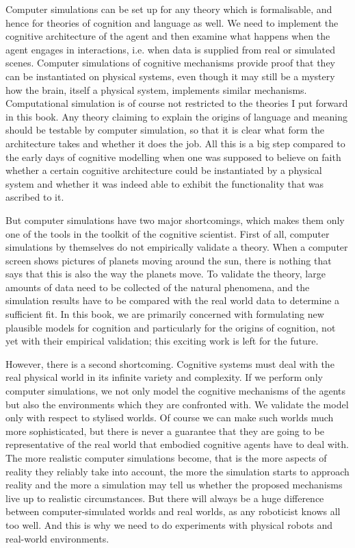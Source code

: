 Computer simulations can be set up for any theory which 
is formalisable, and hence for theories of cognition
and language as well. We need to implement the cognitive architecture
of the agent and then examine what happens when the agent
engages in interactions, i.e. when data is supplied from 
real or simulated scenes. Computer simulations of cognitive mechanisms
provide proof that they can be instantiated
on physical systems, even though it may still be
a mystery how the brain, 
itself a physical system, implements similar mechanisms. 
Computational simulation is of course 
not restricted to the theories I put forward in 
this book. Any theory claiming
to explain the origins of language and meaning 
should be testable by computer simulation, so that 
it is clear what form the architecture takes and whether
it does the job. All this is a big step compared to 
the early days of cognitive modelling when one was
supposed to believe on faith whether a certain cognitive
architecture could be instantiated by a physical 
system and whether it was indeed able to exhibit the functionality 
that was ascribed to it. 

But computer simulations have two major shortcomings, 
which makes them only one of the tools in the toolkit 
of the cognitive scientist. First of all, computer simulations by
themselves do not empirically validate a theory. When 
a computer screen shows pictures of planets moving around 
the sun, there is nothing that says that this is also 
the way the planets move. To validate the theory, large amounts of
data need to be collected of
the natural phenomena, and the simulation 
results have to be compared with the real world data to determine a sufficient
fit. In this book, we are primarily concerned with 
formulating new plausible models for cognition and particularly
for the origins of cognition, not yet with their
empirical validation; this exciting work is left for the future. 

However, there is a second shortcoming. Cognitive systems
must deal with the real physical world in its infinite variety 
and complexity. If we perform only computer simulations, 
we not only model the cognitive mechanisms of the 
agents but also the environments which they are 
confronted with. We validate the model only with 
respect to stylised worlds. Of course we can make
such worlds much more sophisticated, but 
there is never a guarantee that they are going to be
representative of the real world that
embodied cognitive agents have to deal with. 
The more realistic computer simulations 
become, that is the more aspects of reality they reliably 
take into account, the more the simulation starts to approach 
reality and the more a simulation may tell us whether
the proposed mechanisms live up to realistic circumstances.
But there will always be a huge difference between 
computer-simulated worlds and real worlds, as any
roboticist knows all too well. 
And this is why we need to do experiments
with physical robots and real-world environments. 

